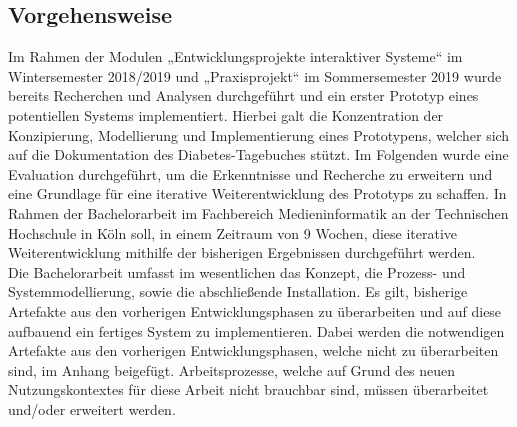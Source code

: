 \subsection{Vorgehensweise}
	Im Rahmen der Modulen „Entwicklungsprojekte interaktiver Systeme“ im Wintersemester 2018/2019 und „Praxisprojekt“ im Sommersemester 2019 wurde bereits Recherchen und Analysen durchgeführt und ein erster Prototyp eines potentiellen Systems implementiert. Hierbei galt die Konzentration der Konzipierung, Modellierung und Implementierung eines Prototypens, welcher sich auf die Dokumentation des Diabetes-Tagebuches stützt. Im Folgenden wurde eine Evaluation durchgeführt, um die Erkenntnisse und Recherche zu erweitern und eine Grundlage für eine iterative Weiterentwicklung des Prototyps zu schaffen. In Rahmen der Bachelorarbeit im Fachbereich Medieninformatik an der Technischen Hochschule in Köln soll, in einem Zeitraum von 9 Wochen, diese iterative Weiterentwicklung mithilfe der bisherigen Ergebnissen durchgeführt werden. \\
	Die Bachelorarbeit umfasst im wesentlichen das Konzept, die Prozess- und Systemmodellierung, sowie die abschließende Installation. Es gilt, bisherige Artefakte aus den vorherigen Entwicklungsphasen zu überarbeiten und auf diese aufbauend ein fertiges System zu implementieren. Dabei werden die notwendigen Artefakte aus den vorherigen Entwicklungsphasen, welche nicht zu überarbeiten sind, im Anhang beigefügt. Arbeitsprozesse, welche auf Grund des neuen Nutzungskontextes für diese Arbeit nicht brauchbar sind, müssen überarbeitet und/oder erweitert werden. 
